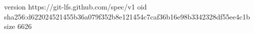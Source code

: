 version https://git-lfs.github.com/spec/v1
oid sha256:d622024521455b36a079f352b8e121454c7caf36b16e98b3342328df55ee4c1b
size 6626
